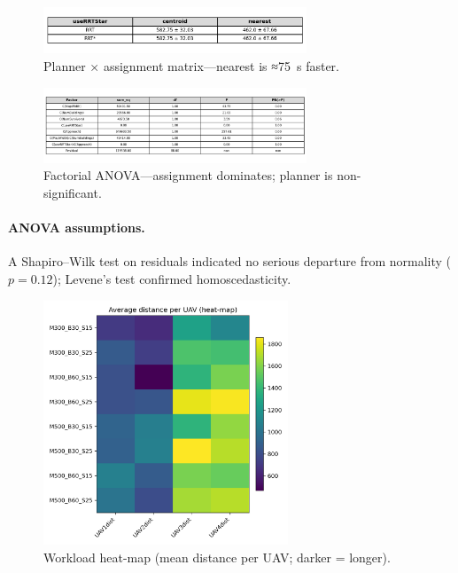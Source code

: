 \documentclass[12pt,a4paper]{report}
\begin{document}
\begin{figure}[H]
  \centering
  \includegraphics[width=0.7\textwidth]{analysis/planner_x_approach.png}
  \caption{Planner × assignment matrix—nearest is ≈\SI{75}{\second} faster.}
  \label{fig:planner_approach}
\end{figure}

\begin{figure}[H]
  \centering
  \includegraphics[width=0.7\textwidth]{analysis/anova_results.png}
  \caption{Factorial ANOVA—assignment dominates; planner is non-significant.}
  \label{fig:anovares}
\end{figure}

\paragraph{ANOVA assumptions.}
A Shapiro–Wilk test on residuals indicated no serious departure from
normality (\(p = 0.12\)); Levene’s test confirmed homoscedasticity.

\begin{figure}[H]
  \centering
  \includegraphics[width=0.65\textwidth]{analysis/workload_heatmap.png}
  \caption{Workload heat-map (mean distance per UAV; darker = longer).}
  \label{fig:workload}
\end{figure}
\end{document}
